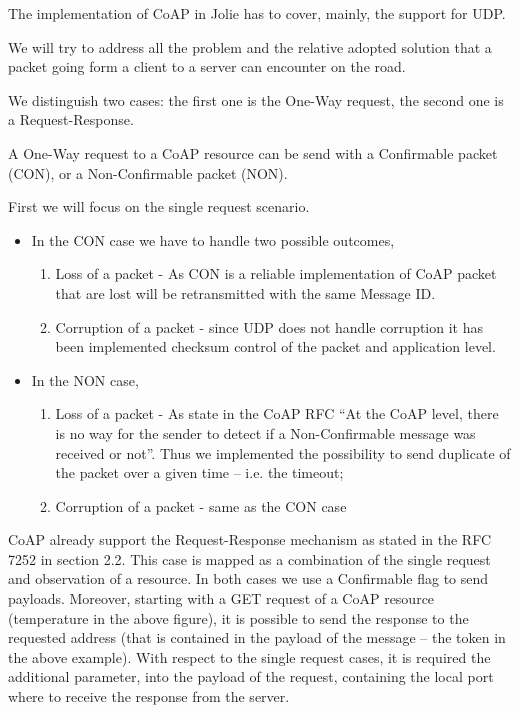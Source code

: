 The implementation of CoAP in Jolie has to cover, mainly, the support for UDP. 

We will try to address all the problem and the relative adopted solution that a packet going form a client to a server can encounter on the road.

We distinguish two cases: the first one is the One-Way request, the second one is a Request-Response.

A One-Way request to a CoAP resource can be send with a Confirmable packet (CON), or a Non-Confirmable packet (NON).

First we will focus on the single request scenario.
\begin{itemize}
    \item In the CON case we have to handle two possible outcomes,
    \begin{enumerate}
        \item Loss of a packet - As CON is a reliable implementation of CoAP packet that are lost will be retransmitted with the same Message ID.
        \item Corruption of a packet - since UDP does not handle corruption it has been implemented checksum control of the packet and application level. 
    \end{enumerate}
    \item In the NON case,
    \begin{enumerate}
        \item Loss of a packet - As state in the CoAP RFC ``At the CoAP level, there is no way for the sender to detect if a Non-Confirmable message was received or not''. Thus we implemented the possibility to send duplicate of the packet over a given time -- i.e. the timeout; 
        \item Corruption of a packet - same as the CON case
    \end{enumerate}
\end{itemize}

CoAP already support the Request-Response mechanism as stated in the RFC 7252 in section 2.2. This case is mapped as a combination of the single request and observation of a resource. In both cases we use a Confirmable flag to send payloads. Moreover, starting with a GET request of a CoAP resource (temperature in the above figure), it is possible to send the response to the requested address (that is contained in the payload of the message -- the token in the above example). With respect to the single request cases, it is required the additional parameter, into the payload of the request, containing the local port where to receive the response from the server.

